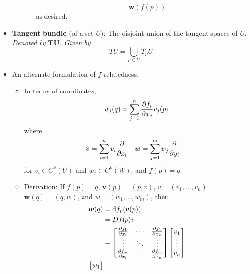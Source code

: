 \documentclass[../notes.tex]{subfiles}
\begin{document}
\begin{itemize}
\begin{itemize}
\begin{itemize}
\begin{equation*}
                = \bm{w}(f(p))
            \end{equation*}
            as desired.
        \end{itemize}
    \end{itemize}
    \item \textbf{Tangent bundle} (of a set $U$): The disjoint union of the tangent spaces of $U$. \emph{Denoted by} $\bm{TU}$. \emph{Given by}
    \begin{equation*}
        TU = \bigcup_{p\in U}T_pU
    \end{equation*}
    \item An alternate formulation of $f$-relatedness.
    \begin{itemize}
        \item In terms of coordinates,
        \begin{equation*}
            w_i(q) = \sum_{j=1}^n\pdv{f_i}{x_j}(p)v_j(p)
        \end{equation*}
        where
        \begin{align*}
            \bm{v} &= \sum_{i=1}^nv_i\pdv{x_i}&
            \bm{w} &= \sum_{j=1}^mw_j\pdv{y_i}
        \end{align*}
        for $v_i\in C^k(U)$ and $w_j\in C^k(W)$, and $f(p)=q$.
        \item Derivation: If $f(p)=q$, $\bm{v}(p)=(p,v)$, $v=(v_1,\dots,v_n)$, $\bm{w}(q)=(q,w)$, and $w=(w_1,\dots,w_m)$, then
        \begin{align*}
            \bm{w}(q) &= \dd f_p(\bm{v}(p))\\
            &= Df(p)v\\
            &=
            \begin{bmatrix}
                \pdv{f_1}{x_1} & \cdots & \pdv{f_1}{x_n}\\
                \vdots & \ddots & \vdots\\
                \pdv{f_m}{x_1} & \cdots & \pdv{f_m}{x_n}\\
            \end{bmatrix}
            \begin{bmatrix}
                v_1\\
                \vdots\\
                v_n\\
            \end{bmatrix}\\
            \begin{bmatrix}
                w_1\\

\end{bmatrix}
\end{align*}
\end{itemize}
\end{itemize}
\end{document}
